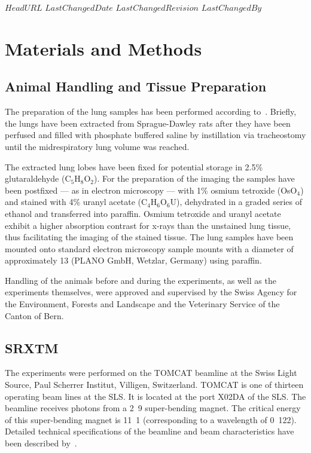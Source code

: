 \svnidlong
{$HeadURL$}
{$LastChangedDate$}
{$LastChangedRevision$}
{$LastChangedBy$}
\section{Materials and Methods}
\label{sec:materials and methods}
\subsection{Animal Handling and Tissue Preparation}
The preparation of the lung samples has been performed according to~\citet{Schittny1997,Schittny1998}. Briefly, the lungs have been extracted from Sprague-Dawley rats after they have been perfused and filled with phosphate buffered saline by instillation via tracheostomy until the midrespiratory lung volume was reached.

The extracted lung lobes have been fixed for potential storage in 2.5\% glutaraldehyde (C$_5$H$_8$O$_2$). For the preparation of the imaging the samples have been postfixed --- as in electron microscopy --- with 1\% osmium tetroxide (OsO$_4$) and stained with 4\% uranyl acetate (C$_4$H$_6$O$_6$U), dehydrated in a graded series of ethanol and transferred into paraffin. Osmium tetroxide and uranyl acetate exhibit a higher absorption contrast for x-rays than the unstained lung tissue, thus facilitating the imaging of the stained tissue. The lung samples have been mounted onto standard electron microscopy sample mounts with a diameter of approximately \unit{13}{\milli\meter} (PLANO GmbH, Wetzlar, Germany) using paraffin.

Handling of the animals before and during the experiments, as well as the experiments themselves, were approved and supervised by the Swiss Agency for the Environment, Forests and Landscape and the Veterinary Service of the Canton of Bern.

\subsection{SRXTM}
The experiments were performed on the TOMCAT beamline at the Swiss Light Source, Paul Scherrer Institut, Villigen, Switzerland. TOMCAT is one of thirteen operating beam lines at the SLS. It is located at the port X02DA of the SLS. The beamline receives photons from a \unit{2.9}{\tesla} super-bending magnet. The critical energy of this super-bending magnet is \unit{11.1}{\kilo\electronvolt} (corresponding to a wavelength of \unit{0.122}{\nano\meter}). Detailed technical specifications of the beamline and beam characteristics have been described by~\citet{Stampanoni2006a,Stampanoni2007}.

